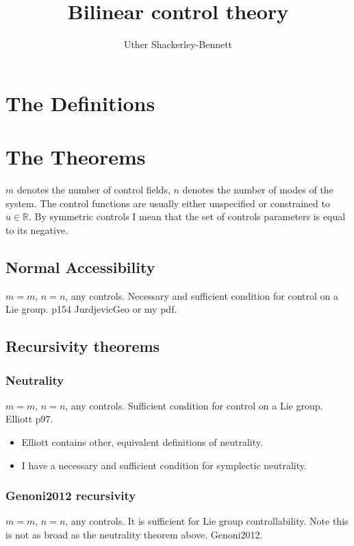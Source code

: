 


\title{Bilinear control theory}
\author{Uther Shackerley-Bennett}
\maketitle

\tableofcontents

\section{The Definitions}


\section{The Theorems}
$m$ denotes the number of control fields, $n$ denotes the number of modes of the system. The control functions are usually either unspecified or constrained to $u \in \mathbb{R}$. By symmetric controls I mean that the set of controls parameters is equal to its negative.

\subsection{Normal Accessibility}
$m=m$, $n=n$, any controls. Necessary and sufficient condition for control on a Lie group. p154 JurdjevicGeo or my pdf.

\subsection{Recursivity theorems}
\subsubsection{Neutrality}
$m=m$, $n=n$, any controls. Sufficient condition for control on a Lie group. Elliott p97.
\begin{itemize}
 \item Elliott contains other, equivalent definitions of neutrality.
\item I have a necessary and sufficient condition for symplectic neutrality.
\end{itemize}
\subsubsection{Genoni2012 recursivity}
$m=m$, $n=n$, any controls. It is sufficient for Lie group controllability. Note this is not as broad as the neutrality theorem above. Genoni2012.
